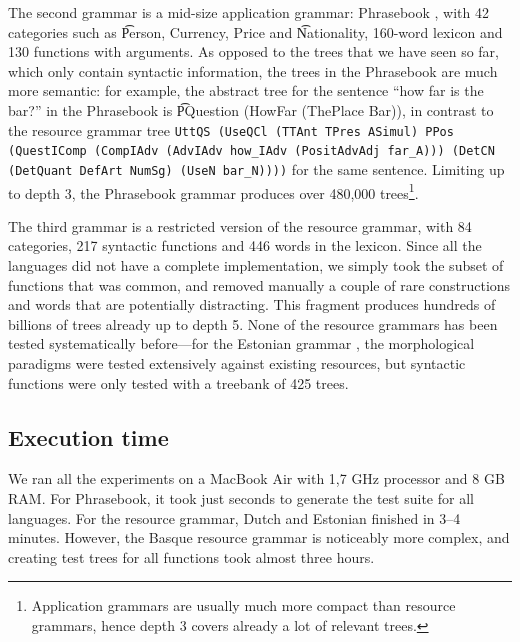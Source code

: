 The second grammar is a mid-size application grammar: Phrasebook
\cite{ranta2010phrasebook}, with 42 categories such as \t{Person,
  Currency, Price} and \t{Nationality}, 160-word lexicon and 130
functions with arguments. As opposed to the trees that we have seen so far,
which only contain syntactic information, the trees in the Phrasebook
are much more semantic: for example, the abstract tree for the
sentence ``how far is the bar?'' in the Phrasebook is \t{PQuestion
  (HowFar (ThePlace Bar))}, in contrast to the resource grammar tree
{\tt \small UttQS (UseQCl (TTAnt TPres ASimul) PPos (QuestIComp
  (CompIAdv (AdvIAdv how\_IAdv (PositAdvAdj far\_A)))
  (DetCN (DetQuant DefArt NumSg) (UseN bar\_N))))} for the same
sentence. Limiting up to depth 3, the Phrasebook grammar produces over
480,000 trees\footnote{Application grammars are usually
much more compact than resource grammars, hence depth 3 covers already
a lot of relevant trees.}.



The third grammar is a restricted version of the \gf{} resource grammar,
with 84 categories, 217 syntactic functions and 446 words in the
lexicon. Since all the languages did not have a complete
implementation, we simply took the subset of functions that was
common, and removed manually a couple of rare constructions and words
that are potentially distracting.
This fragment produces hundreds of billions of trees already up to depth 5.
None of the resource grammars has been tested systematically before---for
the Estonian grammar \cite{listenmaa_kaljurand2014}, the morphological
paradigms were tested extensively against existing resources, but
syntactic functions were only tested with a treebank of 425 trees.


\subsection{Execution time} We ran all the experiments on a MacBook Air
with 1,7 GHz processor and 8 GB RAM. For Phrasebook, it took just
seconds to generate the test suite for all languages. For the resource
grammar, Dutch and Estonian finished in 3--4 minutes. However, the
Basque resource grammar is noticeably more complex, and creating test
trees for all functions took almost three hours.

